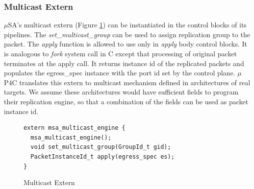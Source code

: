 \subsubsection{Multicast Extern}
$\mu$SA's multicast extern (Figure \ref{fig:msa-multicast-extern}) can be instantiated in the control blocks of its pipelines.
The \emph{set\_multicast\_group} can be used to assign replication group to the packet. 
The \emph{apply} function is allowed to use only in \emph{apply} body control blocks. 
It is analogous to \emph{fork} system call in C except that processing of original packet terminates at the apply call.
It returns instance id of the replicated packets and populates the egress\_spec instance with the port id set by the control plane.
$\mu$P4C translates this extern to multicast mechanism defined in architectures of real targets.
We assume these architectures would have sufficient fields to program their replication engine, so that a combination of the fields can be used as packet instance id.
\begin{figure}[!h]
\begin{lstlisting}[frame=none]
extern msa_multicast_engine {
  msa_multicast_engine();
  void set_multicast_group(GroupId_t gid);
  PacketInstanceId_t apply(egress_spec es);
}
\end{lstlisting}
\caption{Multicast Extern}
\label{fig:msa-multicast-extern}
\end{figure}
